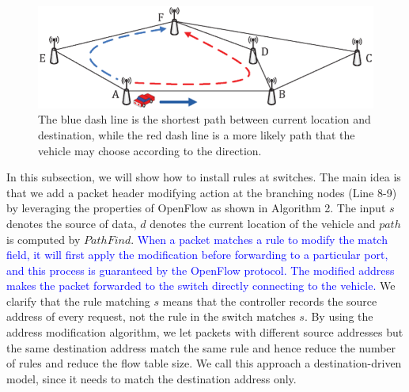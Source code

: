 \documentclass[journal]{IEEEtran}
\begin{document}
\vspace{-0.05in}

\begin{figure} [t]
\begin{center}
\includegraphics[width=0.9\columnwidth]{fig-5-31.eps}

\caption{The blue dash line is the shortest path between current location and destination, while the red dash line is a more likely path that the vehicle may choose according to the direction.} \label{fig5}
\end{center}
\vspace{-0.3in}
\end{figure}

In this subsection, we will show how to install rules at switches. The main idea is that we add a packet header modifying action at the branching nodes (Line 8-9) by leveraging the properties of OpenFlow as shown in Algorithm 2. The input $s$ denotes the source of data, $d$ denotes the current location of the vehicle and $path$ is computed by $PathFind$. \textcolor{blue}{When a packet matches a rule to modify the match field, it will first apply the modification before forwarding to a particular port, and this process is guaranteed by the OpenFlow protocol. The modified address makes the packet forwarded to the switch directly connecting to the vehicle.} We clarify that the rule matching $s$ means that the controller records the source address of every request, not the rule in the switch matches $s$. By using the address modification algorithm, we let packets with different source addresses but the same destination address match the same rule and hence reduce the number of rules and reduce the flow table size. We call this approach a destination-driven model, since it needs to match the destination address only.
\end{document}
